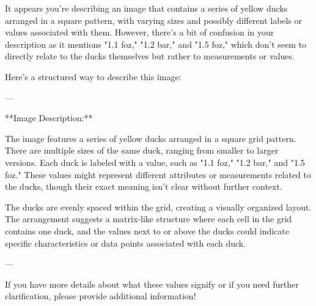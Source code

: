 It appears you're describing an image that contains a series of yellow ducks arranged in a square pattern, with varying sizes and possibly different labels or values associated with them. However, there's a bit of confusion in your description as it mentions "1.1 foz," "1.2 bar," and "1.5 foz," which don't seem to directly relate to the ducks themselves but rather to measurements or values.

Here’s a structured way to describe this image:

---

**Image Description:**

The image features a series of yellow ducks arranged in a square grid pattern. There are multiple sizes of the same duck, ranging from smaller to larger versions. Each duck is labeled with a value, such as "1.1 foz," "1.2 bar," and "1.5 foz." These values might represent different attributes or measurements related to the ducks, though their exact meaning isn't clear without further context.

The ducks are evenly spaced within the grid, creating a visually organized layout. The arrangement suggests a matrix-like structure where each cell in the grid contains one duck, and the values next to or above the ducks could indicate specific characteristics or data points associated with each duck.

---

If you have more details about what these values signify or if you need further clarification, please provide additional information!